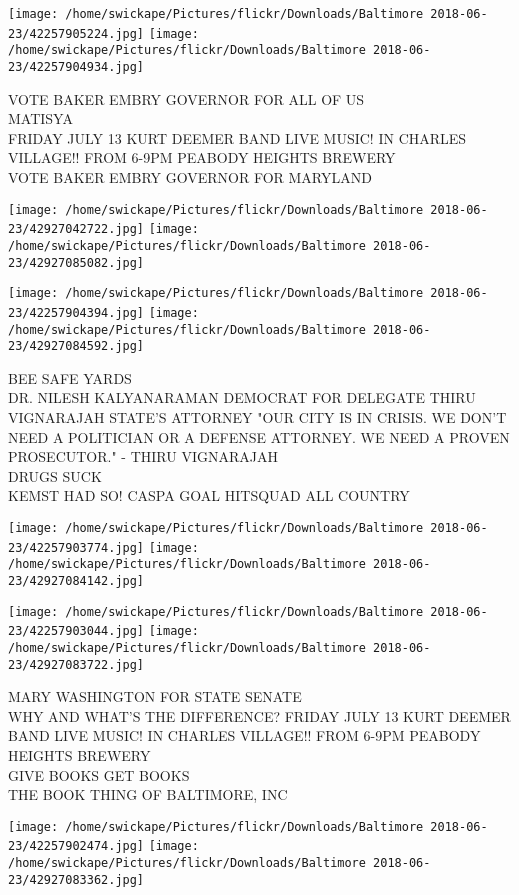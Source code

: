 \documentclass[10pt,letterpaper]{article}
\begin{document}
\texttt{[image: /home/swickape/Pictures/flickr/Downloads/Baltimore 2018-06-23/42257905224.jpg]}
\texttt{[image: /home/swickape/Pictures/flickr/Downloads/Baltimore 2018-06-23/42257904934.jpg]}

VOTE BAKER EMBRY GOVERNOR FOR ALL OF US\\
MATISYA\\
FRIDAY JULY 13 KURT DEEMER BAND LIVE MUSIC!  IN CHARLES VILLAGE!!  FROM 6{-}9PM PEABODY HEIGHTS BREWERY\\
VOTE BAKER EMBRY GOVERNOR FOR MARYLAND
\pagebreak

\texttt{[image: /home/swickape/Pictures/flickr/Downloads/Baltimore 2018-06-23/42927042722.jpg]}
\texttt{[image: /home/swickape/Pictures/flickr/Downloads/Baltimore 2018-06-23/42927085082.jpg]}

\texttt{[image: /home/swickape/Pictures/flickr/Downloads/Baltimore 2018-06-23/42257904394.jpg]}
\texttt{[image: /home/swickape/Pictures/flickr/Downloads/Baltimore 2018-06-23/42927084592.jpg]}

BEE SAFE YARDS\\
DR. NILESH KALYANARAMAN DEMOCRAT FOR DELEGATE THIRU VIGNARAJAH STATE'S ATTORNEY "OUR CITY IS IN CRISIS.  WE DON'T NEED A POLITICIAN OR A DEFENSE ATTORNEY.  WE NEED A PROVEN PROSECUTOR." {-} THIRU VIGNARAJAH\\
DRUGS SUCK\\
KEMST HAD SO!  CASPA GOAL HITSQUAD ALL COUNTRY
\pagebreak

\texttt{[image: /home/swickape/Pictures/flickr/Downloads/Baltimore 2018-06-23/42257903774.jpg]}
\texttt{[image: /home/swickape/Pictures/flickr/Downloads/Baltimore 2018-06-23/42927084142.jpg]}

\texttt{[image: /home/swickape/Pictures/flickr/Downloads/Baltimore 2018-06-23/42257903044.jpg]}
\texttt{[image: /home/swickape/Pictures/flickr/Downloads/Baltimore 2018-06-23/42927083722.jpg]}

MARY WASHINGTON FOR STATE SENATE\\
WHY AND WHAT'S THE DIFFERENCE?  FRIDAY JULY 13 KURT DEEMER BAND LIVE MUSIC!  IN CHARLES VILLAGE!!  FROM 6{-}9PM PEABODY HEIGHTS BREWERY\\
GIVE BOOKS GET BOOKS\\
THE BOOK THING OF BALTIMORE, INC
\pagebreak

\texttt{[image: /home/swickape/Pictures/flickr/Downloads/Baltimore 2018-06-23/42257902474.jpg]}
\texttt{[image: /home/swickape/Pictures/flickr/Downloads/Baltimore 2018-06-23/42927083362.jpg]}
\end{document}
